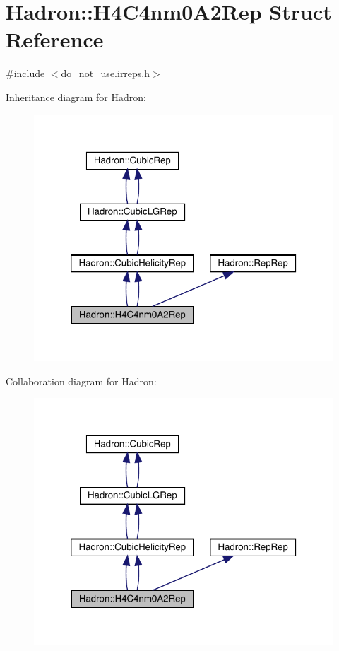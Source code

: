 \hypertarget{structHadron_1_1H4C4nm0A2Rep}{}\section{Hadron\+:\+:H4\+C4nm0\+A2\+Rep Struct Reference}
\label{structHadron_1_1H4C4nm0A2Rep}


{\ttfamily \#include $<$do\+\_\+not\+\_\+use.\+irreps.\+h$>$}



Inheritance diagram for Hadron\+:\nopagebreak
\begin{figure}[H]
\begin{center}
\leavevmode
\includegraphics[width=320pt]{d2/d48/structHadron_1_1H4C4nm0A2Rep__inherit__graph}
\end{center}
\end{figure}


Collaboration diagram for Hadron\+:\nopagebreak
\begin{figure}[H]
\begin{center}
\leavevmode
\includegraphics[width=320pt]{d9/d2e/structHadron_1_1H4C4nm0A2Rep__coll__graph}
\end{center}
\end{figure}
